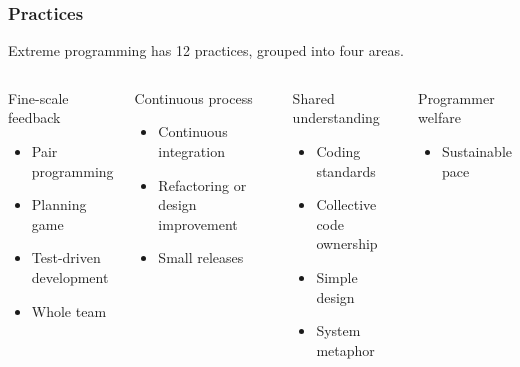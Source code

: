 \begin{frame}
    \frametitle{Practices}
    Extreme programming has 12 practices, grouped into four areas.
    \begin{columns}
        \begin{block}{Fine-scale feedback}
            \begin{itemize}
                \item Pair programming
                \item Planning game
                \item Test-driven development
                \item Whole team
            \end{itemize}
        \end{block}\pause
        \begin{block}{Continuous process}
            \begin{itemize}
                \item Continuous integration
                \item Refactoring or design improvement
                \item Small releases
            \end{itemize}
        \end{block}\pause
        \begin{block}{Shared understanding}
            \begin{itemize}
                \item Coding standards
                \item Collective code ownership
                \item Simple design
                \item System metaphor
            \end{itemize}
        \end{block}\pause
        \begin{block}{Programmer welfare}
            \begin{itemize}
                \item Sustainable pace
            \end{itemize}
        \end{block}
    \end{columns}
\end{frame}